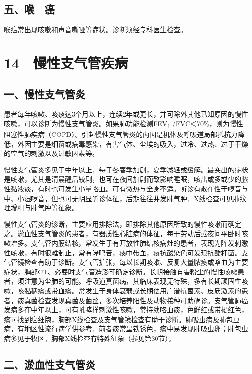 \subsection{五、喉　癌}

喉癌常出现咳嗽和声音嘶哑等症状。诊断须经专科医生检查。

\protect\hypertarget{text00064.html}{}{}

\section{14　慢性支气管疾病}

\subsection{一、慢性支气管炎}

患者每年咳嗽、咳痰达3个月以上，连续2年或更长，并可除外其他已知原因的慢性咳嗽，可以诊断为慢性支气管炎。如果肺功能检测FEV\textsubscript{1}
/FVC＜70\%，则为慢性阻塞性肺疾病（COPD）。引起慢性支气管炎的内因是机体及呼吸道局部抵抗力降低，外因主要是细菌或病毒感染，有害气体、尘埃的吸入，过冷、过热、过于干燥的空气的刺激以及过敏因素等。

慢性支气管炎多见于中年以上，每于冬春季加剧，夏季减轻或缓解。最突出的症状是咳嗽，尤其是清晨醒后较剧，也可在夜间加剧而致影响睡眠，咳出或多或少的脓性黏液痰，有时也可发生小量咯血。可有微热与全身不适。听诊有散在性干啰音与中、小湿啰音，但也可无明显听诊体征，后期往往并发肺气肿，X线检查可见肺纹理增粗与肺气肿等征象。

慢性支气管炎的诊断，主要应用排除法，即排除其他原因所致的慢性咳嗽而确定之。淤血性支气管炎的患者，有器质性心脏病的体征，每于劳动后或夜间平卧时咳嗽增多。支气管内膜结核，常发生于有开放性肺结核病灶的患者，表现为阵发刺激性咳嗽，有时很难制止，常有哮鸣音，痰中带血，痰抗酸染色可发现抗酸杆菌。支气管镜检查有助于诊断。支气管扩张，每以长期咳嗽、反复大量脓痰或咯血为主要症状，胸部CT、必要时支气管造影可确定诊断。长期接触有害粉尘的慢性咳嗽患者，须注意为尘肺的可能。呼吸道真菌病，其临床表现无特殊，多有长期顽固性咳嗽，咳黏稠痰或带血痰。常发生于身体衰弱或长期使用广谱抗菌素、皮质激素的患者，痰真菌检查发现真菌及菌丝，多次培养阳性及动物接种可助确诊。支气管肺癌发病多在中年以上，可有吼哮样刺激性咳嗽，常持续咯血痰，色鲜红或带褐红色，痰可找到癌细胞，胸部X线检查及支气管镜检查有助于诊断。肺吸虫病及肺包虫病，有地区性流行病学供参考，前者痰常呈铁锈色，痰中易发现肺吸虫卵；肺包虫病多见于牧区，胸部X线检查有特殊征象（参见第30节）。

\subsection{二、淤血性支气管炎}

